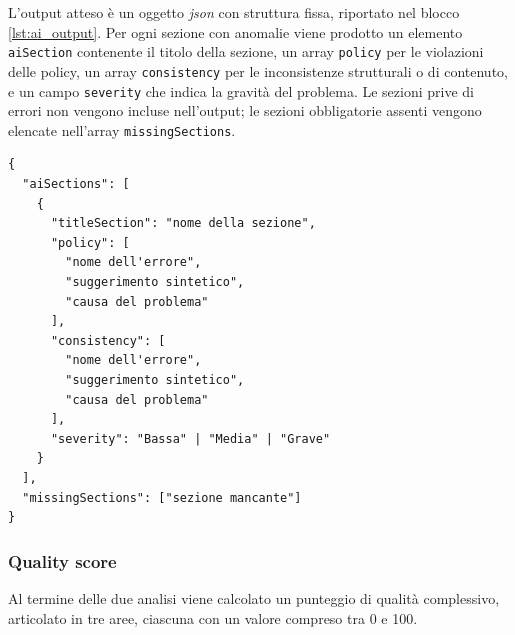 L'output atteso è un oggetto \emph{json} con struttura fissa, riportato nel blocco \ref{lst:ai_output}. Per ogni sezione con anomalie viene prodotto un elemento \texttt{aiSection} contenente il titolo della sezione, un array \texttt{policy} per le violazioni delle policy, un array \texttt{consistency} per le inconsistenze strutturali o di contenuto, e un campo \texttt{severity} che indica la gravità del problema. Le sezioni prive di errori non vengono incluse nell'output; le sezioni obbligatorie assenti vengono elencate nell'array \texttt{missingSections}.

\begin{lstlisting}[label={lst:ai_output}]
{
  "aiSections": [
    {
      "titleSection": "nome della sezione",
      "policy": [
        "nome dell'errore",
        "suggerimento sintetico",
        "causa del problema"
      ],
      "consistency": [
        "nome dell'errore",
        "suggerimento sintetico",
        "causa del problema"
      ],
      "severity": "Bassa" | "Media" | "Grave"
    }
  ],
  "missingSections": ["sezione mancante"]
}
\end{lstlisting}

\subsubsection{Quality score}
Al termine delle due analisi viene calcolato un punteggio di qualità complessivo, articolato in tre aree, ciascuna con un valore compreso tra 0 e 100.

